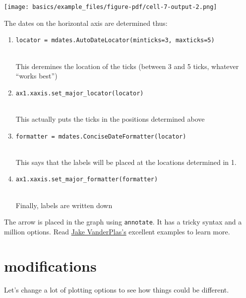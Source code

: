 \documentclass[
  letterpaper,
  DIV=11,
  numbers=noendperiod]{scrreprt}
\providecommand{\tightlist}{%
  \setlength{\itemsep}{0pt}\setlength{\parskip}{0pt}}\usepackage{longtable,booktabs,array}
\begin{document}
\texttt{[image: basics/example\_files/figure-pdf/cell-7-output-2.png]}

The dates on the horizontal axis are determined thus:

\begin{enumerate}
\def\labelenumi{\arabic{enumi}.}
\tightlist
\item
  \texttt{locator\ =\ mdates.AutoDateLocator(minticks=3,\ maxticks=5)}\strut \\
  This deremines the location of the ticks (between 3 and 5 ticks,
  whatever ``works best'')
\item
  \texttt{ax1.xaxis.set\_major\_locator(locator)}\strut \\
  This actually puts the ticks in the positions determined above
\item
  \texttt{formatter\ =\ mdates.ConciseDateFormatter(locator)}\strut \\
  This says that the labels will be placed at the locations determined
  in 1.
\item
  \texttt{ax1.xaxis.set\_major\_formatter(formatter)}\strut \\
  Finally, labels are written down
\end{enumerate}

The arrow is placed in the graph using \texttt{annotate}. It has a
tricky syntax and a million options. Read
\href{https://jakevdp.github.io/PythonDataScienceHandbook/04.09-text-and-annotation.html\#Arrows-and-Annotation}{Jake
VanderPlas's} excellent examples to learn more.

\section{modifications}\label{modifications}

Let's change a lot of plotting options to see how things could be
different.
\end{document}
